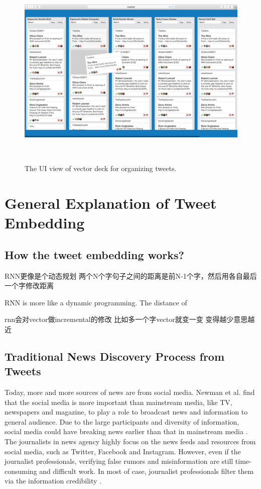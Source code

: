 \begin{figure}[thb!]
    \includegraphics[width= \textwidth]{images/vector_deck}
   \caption{The UI view of vector deck for organizing tweets.  } ~\label{fig: vector_deck}
\end{figure}


\section{General Explanation of Tweet Embedding}

\subsection{How the tweet embedding works?}


RNN更像是个动态规划
两个N个字句子之间的距离是前N-1个字，然后用各自最后一个字修改距离



RNN is more like a dynamic programming. The distance of 

rnn会对vector做incremental的修改
比如多一个字vector就变一变
变得越少意思越近






\subsection{Traditional News Discovery Process from Tweets}
Today, more and more sources of news are from social media. Newman et al. \cite{Newman2011} find that the social media is more important than mainstream media, like TV, newspapers and magazine, to play a role to broadcast news and information to general audience. Due to the large participants and diversity of information, social media could have breaking news earlier than that in mainstream media \cite{Kwak2010}. The journalists in news agency highly focus on the news feeds and resources from social media, such as Twitter, Facebook and Instagram. However, even if the journalist professionals, verifying false rumors and misinformation are still time-consuming and difficult work. In most of case, journalist professionals filter them via the information credibility \cite{Silverman2014}. 

